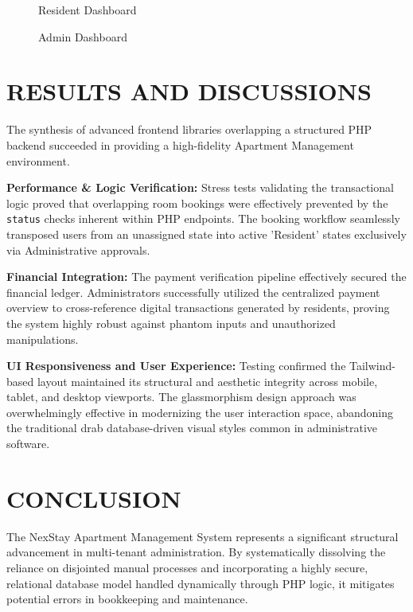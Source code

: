 \documentclass[12pt,a4paper]{report}
\begin{document}
\begin{figure}[H]
    \centering
    \vspace{5cm}
    \caption{Resident Dashboard}
    \label{fig:userdash}
\end{figure}

\begin{figure}[H]
    \centering
    \vspace{5cm}
    \caption{Admin Dashboard}
    \label{fig:admindash}
\end{figure}


\chapter{RESULTS AND DISCUSSIONS}
The synthesis of advanced frontend libraries overlapping a structured PHP backend succeeded in providing a high-fidelity Apartment Management environment.

\textbf{Performance \& Logic Verification:} Stress tests validating the transactional logic proved that overlapping room bookings were effectively prevented by the \texttt{status} checks inherent within PHP endpoints. The booking workflow seamlessly transposed users from an unassigned state into active 'Resident' states exclusively via Administrative approvals.

\textbf{Financial Integration:} The payment verification pipeline effectively secured the financial ledger. Administrators successfully utilized the centralized payment overview to cross-reference digital transactions generated by residents, proving the system highly robust against phantom inputs and unauthorized manipulations. 

\textbf{UI Responsiveness and User Experience:} Testing confirmed the Tailwind-based layout maintained its structural and aesthetic integrity across mobile, tablet, and desktop viewports. The glassmorphism design approach was overwhelmingly effective in modernizing the user interaction space, abandoning the traditional drab database-driven visual styles common in administrative software.

\chapter{CONCLUSION}
The NexStay Apartment Management System represents a significant structural advancement in multi-tenant administration. By systematically dissolving the reliance on disjointed manual processes and incorporating a highly secure, relational database model handled dynamically through PHP logic, it mitigates potential errors in bookkeeping and maintenance.
\end{document}
